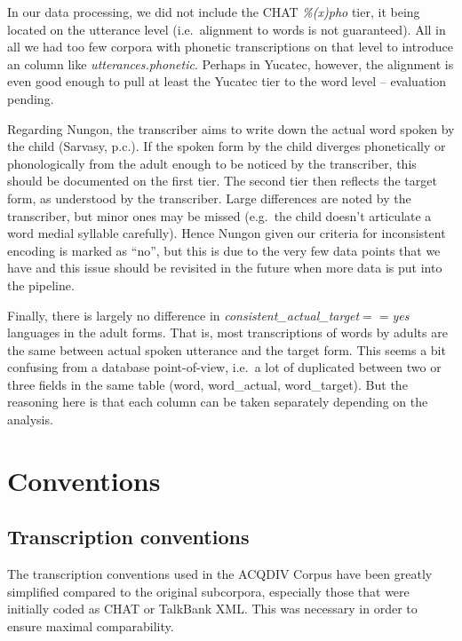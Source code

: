 \documentclass[a4paper, 11pt]{book}
\begin{document}
\noindent In our data processing, we did not include the CHAT \textit{\%(x)pho} tier, it being located on the utterance level (i.e.\ alignment to words is not guaranteed). All in all we had too few corpora with phonetic transcriptions on that level to introduce an column like \textit{utterances.phonetic}. Perhaps in Yucatec, however, the alignment is even good enough to pull at least the Yucatec tier to the word level -- evaluation pending. 

Regarding Nungon, the transcriber aims to write down the actual word spoken by the child (Sarvasy, p.c.). If the spoken form by the child diverges phonetically or phonologically from the adult enough to be noticed by the transcriber, this should be documented on the first tier. The second tier then reflects the target form, as understood by the transcriber. Large differences are noted by the transcriber, but minor ones may be missed (e.g.\ the child doesn't articulate a word medial syllable carefully). Hence Nungon given our criteria for inconsistent encoding is marked as ``no'', but this is due to the very few data points that we have and this issue should be revisited in the future when more data is put into the pipeline.

Finally, there is largely no difference in \textit{consistent\_actual\_target$==$yes} languages in the adult forms. That is, most transcriptions of words by adults are the same between actual spoken utterance and the target form. This seems a bit confusing from a database point-of-view, i.e.\ a lot of duplicated between two or three fields in the same table (word, word\_actual, word\_target). But the reasoning here is that each column can be taken separately depending on the analysis.

\section{Conventions}
\label{sec:Conventions and standardization}

\subsection{Transcription conventions}
\label{subsec:Transcription conventions}

The transcription conventions used in the ACQDIV Corpus have been greatly simplified compared to the original subcorpora, especially those that were initially coded as CHAT or TalkBank XML. This was necessary in order to ensure maximal comparability. 
\end{document}

